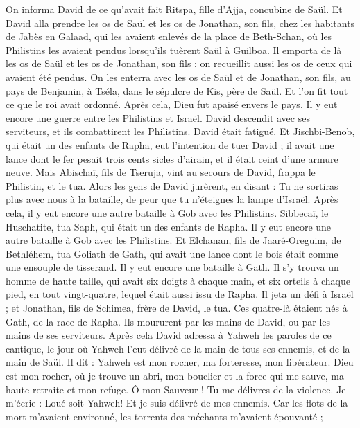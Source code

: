 \begin{multicols}{2}
On informa David de ce qu’avait fait Ritspa, fille d'Ajja, concubine de Saül.
Et David alla prendre les os de Saül et les os de Jonathan, son fils, chez les habitants de Jabès en Galaad, qui les avaient enlevés de la place de Beth-Schan, où les Philistins les avaient pendus lorsqu'ils tuèrent Saül à Guilboa.
Il emporta de là les os de Saül et les os de Jonathan, son fils ; on recueillit aussi les os de ceux qui avaient été pendus.
On les enterra avec les os de Saül et de Jonathan, son fils, au pays de Benjamin, à Tséla, dans le sépulcre de Kis, père de Saül. Et l’on fit tout ce que le roi avait ordonné. Après cela, Dieu fut apaisé envers le pays.
Il y eut encore une guerre entre les Philistins et Israël. David descendit avec ses serviteurs, et ils combattirent les Philistins. David était fatigué.
Et Jischbi-Benob, qui était un des enfants de Rapha, eut l’intention de tuer David ; il avait une lance dont le fer pesait trois cents sicles d'airain, et il était ceint d'une armure neuve.
Mais Abischaï, fils de Tseruja, vint au secours de David, frappa le Philistin, et le tua. Alors les gens de David jurèrent, en disant : Tu ne sortiras plus avec nous à la bataille, de peur que tu n'éteignes la lampe d'Israël.
Après cela, il y eut encore une autre bataille à Gob avec les Philistins. Sibbecaï, le Huschatite, tua Saph, qui était un des enfants de Rapha.
Il y eut encore une autre bataille à Gob avec les Philistins. Et Elchanan, fils de Jaaré-Oreguim, de Bethléhem, tua Goliath de Gath, qui avait une lance dont le bois était comme une ensouple de tisserand.
Il y eut encore une bataille à Gath. Il s’y trouva un homme de haute taille, qui avait six doigts à chaque main, et six orteils à chaque pied, en tout vingt-quatre, lequel était aussi issu de Rapha.
Il jeta un défi à Israël ; et Jonathan, fils de Schimea, frère de David, le tua.
Ces quatre-là étaient nés à Gath, de la race de Rapha. Ils moururent par les mains de David, ou par les mains de ses serviteurs.
\VerseOne{}Après cela David adressa à Yahweh les paroles de ce cantique, le jour où Yahweh l'eut délivré de la main de tous ses ennemis, et de la main de Saül.
Il dit : Yahweh est mon rocher, ma forteresse, mon libérateur.
Dieu est mon rocher, où je trouve un abri, mon bouclier et la force qui me sauve, ma haute retraite et mon refuge. Ô mon Sauveur ! Tu me délivres de la violence.
Je m'écrie : Loué soit Yahweh! Et je suis délivré de mes ennemis.
Car les flots de la mort m'avaient environné, les torrents des méchants m'avaient épouvanté ;

\end{multicols}
